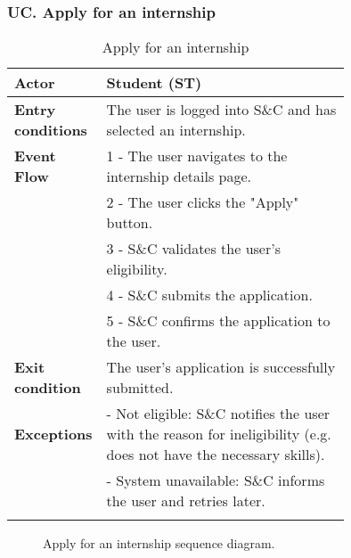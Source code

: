 \subsubsection*{UC\cuc . Apply for an internship}
\begin{center}
    \begin{longtable}{|l|p{0.75\linewidth}|}
        \hline
        \textbf{Actor}            & Student (ST) \\
        \hline
        \textbf{Entry conditions} & The user is logged into S\&C and has selected an internship. \\
        \hline
        \textbf{Event Flow}       & 1 - The user navigates to the internship details page. \\
        & 2 - The user clicks the "Apply" button. \\
        & 3 - S\&C validates the user's eligibility. \\
        & 4 - S\&C submits the application. \\
        & 5 - S\&C confirms the application to the user. \\
        \hline
        \textbf{Exit condition}   & The user's application is successfully submitted. \\       
        \hline
        \textbf{Exceptions}       & - Not eligible: S\&C notifies the user with the reason for ineligibility (e.g. does not have the necessary skills). \\
                                  & - System unavailable: S\&C informs the user and retries later. \\
        \hline
        \caption{Apply for an internship}
        \label{tab:apply_internship_usecase}
    \end{longtable}
\end{center}

\begin{figure}[H]
    \begin{center}
        
        \caption{Apply for an internship sequence diagram.}
        \label{fig:apply_internship_seqd}%
    \end{center}
\end{figure}

